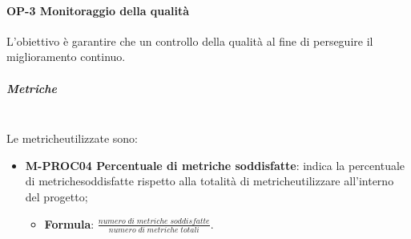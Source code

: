 	\paragraph{OP-3 Monitoraggio della qualità}
		L'obiettivo è garantire che un controllo della qualità al fine di perseguire il miglioramento continuo.
		\subparagraph{Metriche}\mbox{}\\ [1mm]
		Le metriche\glosp utilizzate sono:
			\begin{itemize}
				\item \textbf{M-PROC04 Percentuale di metriche soddisfatte}: indica la percentuale di metriche\glosp soddisfatte rispetto alla totalità di metriche\glosp utilizzare all'interno del progetto\glo;
				\begin{itemize}
					\item[] \textbf{Formula}: $\frac{numero \; di \; metriche \; soddisfatte}{numero \; di \; metriche \; totali}$.
				\end{itemize}
			\end{itemize}

